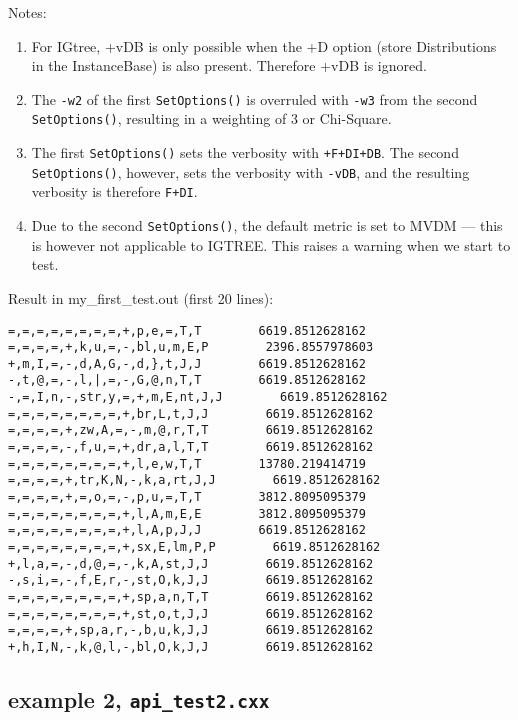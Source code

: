 \documentclass{report}
\begin{document}
Notes:
\begin{enumerate}
\item For IGtree, +vDB is only possible when the +D option (store Distributions
 in the InstanceBase) is also present. Therefore +vDB is ignored.

\item The {\tt -w2} of the first {\tt SetOptions()} is overruled with
  {\tt -w3} from the second {\tt SetOptions()}, resulting in a
  weighting of 3 or Chi-Square. 
\item The first {\tt SetOptions()} sets the verbosity with {\tt +F+DI+DB}.
The second {\tt SetOptions()}, however, sets the verbosity with {\tt -vDB}, and the resulting verbosity is therefore {\tt F+DI}.
\item Due to the second {\tt SetOptions()}, the default metric is set to
MVDM --- this is however not applicable to IGTREE. This raises a warning
when we start to test.
\end{enumerate}

Result in my\_first\_test.out (first 20 lines):
\begin{footnotesize}
\begin{verbatim}
=,=,=,=,=,=,=,=,+,p,e,=,T,T        6619.8512628162
=,=,=,=,+,k,u,=,-,bl,u,m,E,P        2396.8557978603
+,m,I,=,-,d,A,G,-,d,},t,J,J        6619.8512628162
-,t,@,=,-,l,|,=,-,G,@,n,T,T        6619.8512628162
-,=,I,n,-,str,y,=,+,m,E,nt,J,J        6619.8512628162
=,=,=,=,=,=,=,=,+,br,L,t,J,J        6619.8512628162
=,=,=,=,+,zw,A,=,-,m,@,r,T,T        6619.8512628162
=,=,=,=,-,f,u,=,+,dr,a,l,T,T        6619.8512628162
=,=,=,=,=,=,=,=,+,l,e,w,T,T        13780.219414719
=,=,=,=,+,tr,K,N,-,k,a,rt,J,J        6619.8512628162
=,=,=,=,+,=,o,=,-,p,u,=,T,T        3812.8095095379
=,=,=,=,=,=,=,=,+,l,A,m,E,E        3812.8095095379
=,=,=,=,=,=,=,=,+,l,A,p,J,J        6619.8512628162
=,=,=,=,=,=,=,=,+,sx,E,lm,P,P        6619.8512628162
+,l,a,=,-,d,@,=,-,k,A,st,J,J        6619.8512628162
-,s,i,=,-,f,E,r,-,st,O,k,J,J        6619.8512628162
=,=,=,=,=,=,=,=,+,sp,a,n,T,T        6619.8512628162
=,=,=,=,=,=,=,=,+,st,o,t,J,J        6619.8512628162
=,=,=,=,+,sp,a,r,-,b,u,k,J,J        6619.8512628162
+,h,I,N,-,k,@,l,-,bl,O,k,J,J        6619.8512628162
\end{verbatim}
\end{footnotesize}
\clearpage

\subsection{example 2, {\tt api\_test2.cxx}}
\end{document}
